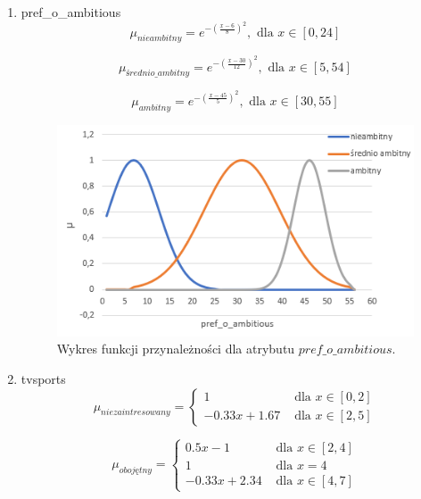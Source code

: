 \documentclass{classrep}
\begin{document}
\begin{enumerate}
  \item pref\_o\_ambitious
  \begin{equation}
    \mu_{nieambitny} = e^{-(\frac{x-6}{8})^2}, \text{ dla } x \in [0,24]
  \end{equation}

  \begin{equation}
    \mu_{średnio\_ambitny} = e^{-(\frac{x-30}{12})^2}, \text{ dla } x \in [5,54]
  \end{equation}

  \begin{equation}
    \mu_{ambitny} = e^{-(\frac{x-45}{5})^2}, \text{ dla } x \in [30,55]
  \end{equation}
  
  \begin{figure}[H]
    \includegraphics{fp_poa.png}
    \caption{Wykres funkcji przynależności dla atrybutu \(pref\_o\_ambitious\).}
    \end{figure}
  
  \item tvsports 
  \begin{equation}
    \mu_{niezaintresowany} =
      \begin{cases}
        1 & \text{ dla } x \in [0,2] \\
        -0.33x+1.67 & \text{ dla } x \in [2,5]       
      \end{cases}  
  \end{equation}

  \begin{equation}
    \mu_{obojętny} =
      \begin{cases}
        0.5x-1 & \text{ dla } x \in [2,4]\\
        1 & \text{ dla } x=4 \\
        -0.33x+2.34 & \text{ dla } x \in [4,7]       
      \end{cases}  
  \end{equation}


\end{enumerate}
\end{document}
